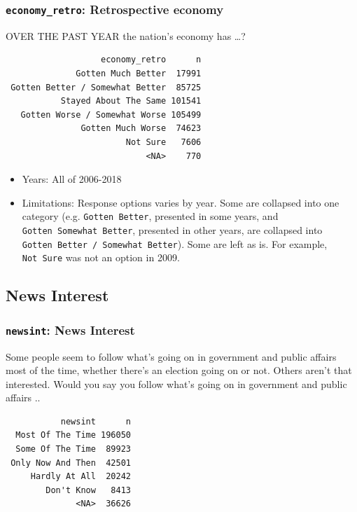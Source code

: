 \documentclass[10pt,article,oneside]{memoir}
\theoremstyle{definition}
\begin{document}
\hypertarget{economy_retro-retrospective-economy}{%
\subsubsection{\texorpdfstring{\texttt{economy\_retro}: Retrospective
economy}{economy\_retro: Retrospective economy}}\label{economy_retro-retrospective-economy}}

OVER THE PAST YEAR the nation's economy has \ldots{}?

\begin{verbatim}
                   economy_retro      n
              Gotten Much Better  17991
 Gotten Better / Somewhat Better  85725
           Stayed About The Same 101541
   Gotten Worse / Somewhat Worse 105499
               Gotten Much Worse  74623
                        Not Sure   7606
                            <NA>    770
\end{verbatim}

\begin{itemize}
\tightlist
\item
  Years: All of 2006-2018
\item
  Limitations: Response options varies by year. Some are collapsed into
  one category (e.g. \texttt{Gotten\ Better}, presented in some years,
  and \texttt{Gotten\ Somewhat\ Better}, presented in other years, are
  collapsed into \texttt{Gotten\ Better\ /\ Somewhat\ Better}). Some are
  left as is. For example, \texttt{Not\ Sure} was not an option in 2009.
\end{itemize}

\hypertarget{news-interest}{%
\subsection{News Interest}\label{news-interest}}

\hypertarget{newsint-news-interest}{%
\subsubsection{\texorpdfstring{\texttt{newsint}: News
Interest}{newsint: News Interest}}\label{newsint-news-interest}}

Some people seem to follow what's going on in government and public
affairs most of the time, whether there's an election going on or not.
Others aren't that interested. Would you say you follow what's going on
in government and public affairs ..

\begin{verbatim}
           newsint      n
  Most Of The Time 196050
  Some Of The Time  89923
 Only Now And Then  42501
     Hardly At All  20242
        Don't Know   8413
              <NA>  36626
\end{verbatim}
\end{document}
